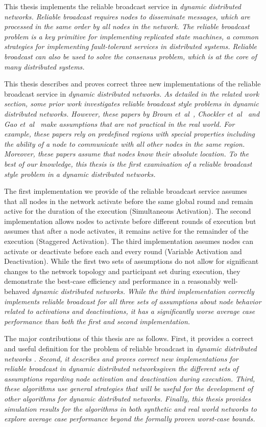 \documentclass[english]{article}
\begin{document}
This thesis implements the reliable broadcast service in \em dynamic distributed networks\em. Reliable broadcast requires nodes to disseminate messages, which are processed in the same order by all nodes in the network. The reliable broadcast problem is a key primitive for implementing replicated state machines, a common strategies for implementing fault-tolerant services in distributed systems. Reliable broadcast can also be used to solve the consensus problem, which is at the core of many distributed systems.

This thesis describes and proves correct three new implementations of the reliable broadcast service in \em dynamic distributed networks\em. As detailed in the related work section, some prior work investigates reliable broadcast style problems in \em dynamic distributed networks\em. However, these papers by Brown et~al~\cite{Brown:2007}, Chockler et~al~\cite{Chockler:2008} and Gao et~al~\cite{Gao:2012} make assumptions that are not practical in the real world. For example, these papers rely on predefined regions with special properties including the ability of a node to communicate with all other nodes in the same region. Moreover, these papers assume that nodes know their absolute location. To the best of our knowledge, this thesis is the first examination of a reliable broadcast style problem in a \em dynamic distributed networks\em.

The first implementation we provide of the reliable broadcast service assumes that all nodes in the network activate before the same global round and remain active for the duration of the execution (Simultaneous Activation). The second implementation allows nodes to activate before different rounds of execution but assumes that after a node activates, it remains active for the remainder of the execution (Staggered Activation).  The third implementation assumes nodes can activate or deactivate before each and every round (Variable Activation and Deactivation). While the first two sets of assumptions do not allow for significant changes to the network topology and participant set during execution, they demonstrate the best-case efficiency and performance in a reasonably well-behaved \em dynamic distributed networks\em. While the third implementation correctly implements reliable broadcast for all three sets of assumptions about node behavior related to activations and deactivations, it has a significantly worse average case performance than both the first and second implementation. 

The major contributions of this thesis are as follows. First, it provides a correct and useful definition for the problem of reliable broadcast in \em dynamic distributed networks \em. Second, it describes and proves correct new implementations for reliable broadcast in \em dynamic distributed networks\em given the different sets of assumptions regarding node activation and deactivation during execution. Third, these algorithms use general strategies that will be useful for the development of other algorithms for \em dynamic distributed networks\em. Finally, this thesis provides simulation results for the algorithms in both synthetic and real world networks to explore average case performance beyond the formally proven worst-case bounds.
\end{document}
